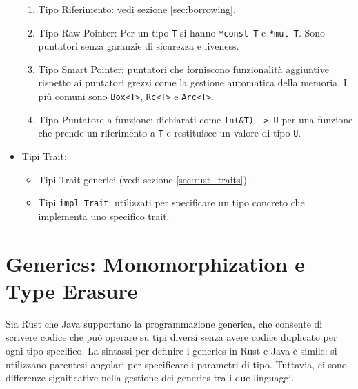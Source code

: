\begin{itemize}
            \begin{enumerate}
                \item Tipo Riferimento: vedi sezione \ref{sec:borrowing}. 
                \item Tipo Raw Pointer: Per un tipo \texttt{T} si hanno \texttt{*const T} e \texttt{*mut T}. Sono puntatori senza garanzie di sicurezza e liveness.
                \item Tipo Smart Pointer: puntatori che forniscono funzionalità aggiuntive rispetto ai puntatori grezzi come la gestione automatica della memoria. I più comuni sono \texttt{Box<T>}, \texttt{Rc<T>} e \texttt{Arc<T>}. 
                \item Tipo Puntatore a funzione: dichiarati come \texttt{fn(\&T) -> U} per una funzione che prende un riferimento a \texttt{T} e restituisce un valore di tipo \texttt{U}.
            \end{enumerate}
        \item Tipi Trait: 
        \begin{itemize}
            \item Tipi Trait generici (vedi sezione \ref{sec:rust_traits}).
            \item Tipi \texttt{impl Trait}: utilizzati per specificare un tipo concreto che implementa uno specifico trait. 
        \end{itemize}
\end{itemize}
\section{Generics: Monomorphization e Type Erasure}
\label{sec:generics}
Sia Rust che Java supportano la programmazione generica, che consente di scrivere codice che può operare su tipi diversi senza avere codice duplicato per ogni tipo specifico. La sintassi per definire i generics in Rust e Java è simile: si utilizzano parentesi angolari per specificare i parametri di tipo. Tuttavia, ci sono differenze significative nella gestione dei generics tra i due linguaggi.

